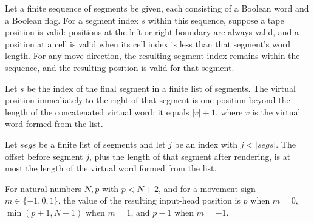 \begin{lemma}
\label{Complexity.LogProg.tmove_valid}
\leanok
{}
Let a finite sequence of segments be given, each consisting of a Boolean word and a
Boolean flag. For a segment index $s$ within this sequence, suppose a tape position is
valid: positions at the left or right boundary are always valid, and a position at a
cell is valid when its cell index is less than that segment's word length. For any move
direction, the resulting segment index remains within the sequence, and the resulting
position is valid for that segment.
\end{lemma}

\begin{lemma}
\label{Complexity.LogProg.vpos_right_last}
\leanok
{}
Let $s$ be the index of the final segment in a finite list of segments. The virtual
position immediately to the right of that segment is one position beyond the length of
the concatenated virtual word: it equals $|v|+1$, where $v$ is the virtual word formed
from the list.
\end{lemma}

\begin{lemma}
\label{Complexity.LogProg.off_add_rlen_le}
\leanok
{}
Let $segs$ be a finite list of segments and let $j$ be an index with $j<|segs|$. The
offset before segment $j$, plus the length of that segment after rendering, is at most
the length of the virtual word formed from the list.
\end{lemma}

\begin{lemma}
\label{Complexity.LogProg.moveInputPos_val}
\leanok
{}
For natural numbers $N,p$ with $p<N+2$, and for a movement sign $m\in\{-1,0,1\}$, the
value of the resulting input-head position is $p$ when $m=0$, $\min(p+1,N+1)$ when
$m=1$, and $p-1$ when $m=-1$.
\end{lemma}

